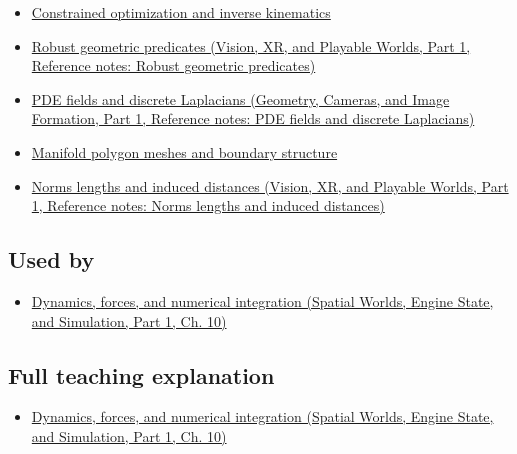 \hypertarget{appendix-a9ba01fa72a6-prerequisites}{}

\begin{itemize}
\tightlist
\item
  \hyperref[appendix-29f4bea4c2bb]{Constrained optimization and inverse kinematics}
\item
  \href{../07-Vision-XR-and-Playable-Worlds-P01/main.pdf\#appendix-341296fb3f64}{Robust geometric predicates (Vision, XR, and Playable Worlds, Part 1, Reference notes: Robust geometric predicates)}
\item
  \href{../03-Geometry-Cameras-and-Image-Formation-P01/main.pdf\#appendix-1988d465c119}{PDE fields and discrete Laplacians (Geometry, Cameras, and Image Formation, Part 1, Reference notes: PDE fields and discrete Laplacians)}
\item
  \hyperref[appendix-fab348609369]{Manifold polygon meshes and boundary structure}
\item
  \href{../07-Vision-XR-and-Playable-Worlds-P01/main.pdf\#appendix-49933872bb51}{Norms lengths and induced distances (Vision, XR, and Playable Worlds, Part 1, Reference notes: Norms lengths and induced distances)}
\end{itemize}

\subsection{Used by}\label{appendix-a9ba01fa72a6-used-by}

\hypertarget{appendix-a9ba01fa72a6-used-by}{}

\begin{itemize}
\tightlist
\item
  \href{../05-Spatial-Worlds-Engine-State-and-Simulation-P01/main.pdf\#04-visual-computing-ii-ch029-dynamics-forces-and-numerical-integration}{Dynamics, forces, and numerical integration (Spatial Worlds, Engine State, and Simulation, Part 1, Ch. 10)}
\end{itemize}

\subsection{Full teaching explanation}\label{appendix-a9ba01fa72a6-full-teaching-explanation}

\hypertarget{appendix-a9ba01fa72a6-full-teaching-explanation}{}

\begin{itemize}
\tightlist
\item
  \href{../05-Spatial-Worlds-Engine-State-and-Simulation-P01/main.pdf\#04-visual-computing-ii-ch029-dynamics-forces-and-numerical-integration}{Dynamics, forces, and numerical integration (Spatial Worlds, Engine State, and Simulation, Part 1, Ch. 10)}
\end{itemize}

